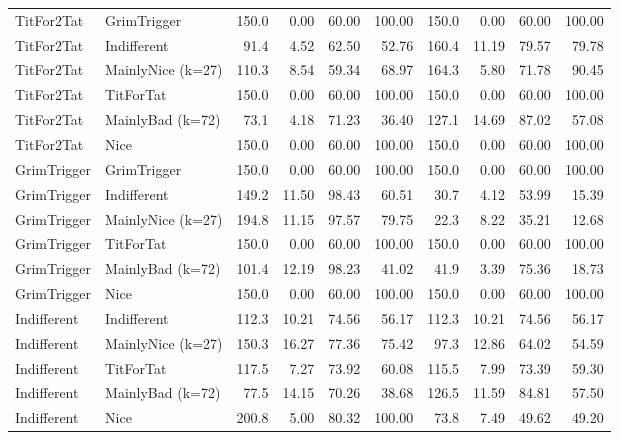\documentclass[journal,a4paper,10pt,twoside]{IEEEtran} %
\begin{document}
\begin{table}[ht]
\begin{tabular}{ll|rrrr|rrrr}
		TitFor2Tat        & GrimTrigger       & 150.0 &  0.00 &  60.00 &     100.00 & 150.0 &  0.00 &  60.00 &     100.00 \\
		TitFor2Tat        & Indifferent       &  91.4 &  4.52 &  62.50 &      52.76 & 160.4 & 11.19 &  79.57 &      79.78 \\
		TitFor2Tat        & MainlyNice (k=27) & 110.3 &  8.54 &  59.34 &      68.97 & 164.3 &  5.80 &  71.78 &      90.45 \\
		TitFor2Tat        & TitForTat         & 150.0 &  0.00 &  60.00 &     100.00 & 150.0 &  0.00 &  60.00 &     100.00 \\
		TitFor2Tat        & MainlyBad (k=72)  &  73.1 &  4.18 &  71.23 &      36.40 & 127.1 & 14.69 &  87.02 &      57.08 \\
		TitFor2Tat        & Nice              & 150.0 &  0.00 &  60.00 &     100.00 & 150.0 &  0.00 &  60.00 &     100.00 \\
		GrimTrigger       & GrimTrigger       & 150.0 &  0.00 &  60.00 &     100.00 & 150.0 &  0.00 &  60.00 &     100.00 \\
		GrimTrigger       & Indifferent       & 149.2 & 11.50 &  98.43 &      60.51 &  30.7 &  4.12 &  53.99 &      15.39 \\
		GrimTrigger       & MainlyNice (k=27) & 194.8 & 11.15 &  97.57 &      79.75 &  22.3 &  8.22 &  35.21 &      12.68 \\
		GrimTrigger       & TitForTat         & 150.0 &  0.00 &  60.00 &     100.00 & 150.0 &  0.00 &  60.00 &     100.00 \\
		GrimTrigger       & MainlyBad (k=72)  & 101.4 & 12.19 &  98.23 &      41.02 &  41.9 &  3.39 &  75.36 &      18.73 \\
		GrimTrigger       & Nice              & 150.0 &  0.00 &  60.00 &     100.00 & 150.0 &  0.00 &  60.00 &     100.00 \\
		Indifferent       & Indifferent       & 112.3 & 10.21 &  74.56 &      56.17 & 112.3 & 10.21 &  74.56 &      56.17 \\
		Indifferent       & MainlyNice (k=27) & 150.3 & 16.27 &  77.36 &      75.42 &  97.3 & 12.86 &  64.02 &      54.59 \\
		Indifferent       & TitForTat         & 117.5 &  7.27 &  73.92 &      60.08 & 115.5 &  7.99 &  73.39 &      59.30 \\
		Indifferent       & MainlyBad (k=72)  &  77.5 & 14.15 &  70.26 &      38.68 & 126.5 & 11.59 &  84.81 &      57.50 \\
		Indifferent       & Nice              & 200.8 &  5.00 &  80.32 &     100.00 &  73.8 &  7.49 &  49.62 &      49.20 \\

\end{tabular}
\end{table}
\end{document}
